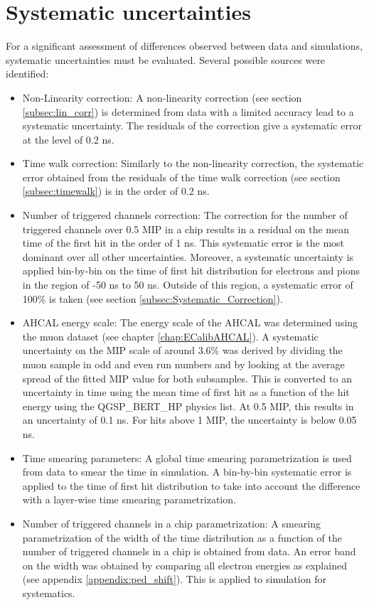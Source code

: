 \section{Systematic uncertainties}

For a significant assessment of differences observed between data and simulations, systematic uncertainties must be evaluated. Several possible sources were identified:

\begin{itemize}
	\item Non-Linearity correction: A non-linearity correction (see section \ref{subsec:lin_corr}) is determined from data with a limited accuracy lead to a systematic uncertainty. The residuals of the correction give a systematic error at the level of 0.2 ns.
	\item Time walk correction: Similarly to the non-linearity correction, the systematic error obtained from the residuals of the time walk correction (see section \ref{subsec:timewalk}) is in the order of 0.2 ns.
	\item Number of triggered channels correction: The correction for the number of triggered channels over 0.5 MIP in a chip results in a residual on the mean time of the first hit in the order of 1 ns. This systematic error is the most dominant over all other uncertainties. Moreover, a systematic uncertainty is applied bin-by-bin on the time of first hit distribution for electrons and pions in the region of -50 ns to 50 ns. Outside of this region, a systematic error of 100\% is taken (see section \ref{subsec:Systematic_Correction}).
	\item AHCAL energy scale: The energy scale of the AHCAL was determined using the muon dataset (see chapter \ref{chap:ECalibAHCAL}). A systematic uncertainty on the MIP scale of around 3.6\% was derived by dividing the muon sample in odd and even run numbers and by looking at the average spread of the fitted MIP value for both subsamples. This is converted to an uncertainty in time using the mean time of first hit as a function of the hit energy using the QGSP\_BERT\_HP physics list. At 0.5 MIP, this results in an uncertainty of 0.1 ns. For hits above 1 MIP, the uncertainty is below 0.05 ns.
	\item Time smearing parameters: A global time smearing parametrization is used from data to smear the time in simulation. A bin-by-bin systematic error is applied to the time of first hit distribution to take into account the difference with a layer-wise time smearing parametrization.
	\item Number of triggered channels in a chip parametrization: A smearing parametrization of the width of the time distribution as a function of the number of triggered channels in a chip is obtained from data. An error band on the width was obtained by comparing all electron energies as explained (see appendix \ref{appendix:ped_shift}). This is applied to simulation for systematics.

\end{itemize}

